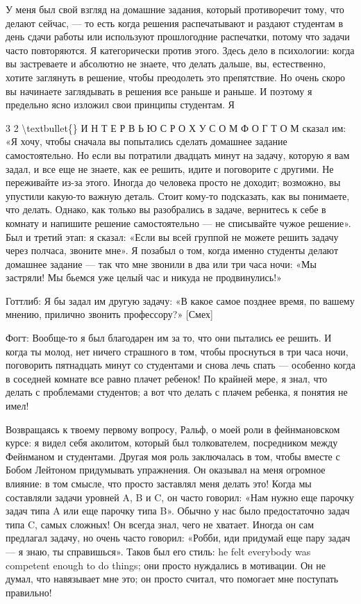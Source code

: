 \documentclass[10pt,oneside]{article}
\begin{document}
У меня был свой взгляд на домашние задания, который противоречит тому, что делают сейчас, --- то есть когда решения распечатывают и раздают студентам в день сдачи работы или используют прошлогодние распечатки, потому что задачи часто повторяются. Я категорически против этого. Здесь дело в психологии: когда вы застреваете и абсолютно не знаете, что делать дальше, вы, естественно, хотите заглянуть в решение, чтобы преодолеть это препятствие. Но очень скоро вы начинаете заглядывать в решения все раньше и раньше. И поэтому я предельно ясно изложил свои принципы студентам. Я\par

3 2 \textbackslash{}textbullet\{\} И Н Т Е Р В Ь Ю  С  Р О Х У С О М  Ф О Г Т О М сказал им: «Я хочу, чтобы сначала вы попытались сделать домашнее задание самостоятельно. Но если вы потратили двадцать минут на задачу, которую я вам задал, и все еще не знаете, как ее решить, идите и поговорите с другими. Не переживайте из-за этого. Иногда до человека просто не доходит; возможно, вы упустили какую-то важную деталь. Стоит кому-то подсказать, как вы понимаете, что делать. Однако, как только вы разобрались в задаче, вернитесь к себе в комнату и напишите решение самостоятельно --- не списывайте чужое решение». Был и третий этап: я сказал: «Если вы всей группой не можете решить задачу через полчаса, звоните мне». Я позабыл о том, когда именно студенты делают домашнее задание --- так что мне звонили в два или три часа ночи: «Мы застряли! Мы бьемся уже целый час и никуда не продвинулись!»\par

Готтлиб: Я бы задал им другую задачу: «В какое самое позднее время, по вашему мнению, прилично звонить профессору?» [Смех]\par

Фогт: Вообще-то я был благодарен им за то, что они пытались ее решить. И когда ты молод, нет ничего страшного в том, чтобы проснуться в три часа ночи, поговорить пятнадцать минут со студентами и снова лечь спать --- особенно когда в соседней комнате все равно плачет ребенок! По крайней мере, я знал, что делать с проблемами студентов; а вот что делать с плачем ребенка, я понятия не имел!\par

Возвращаясь к твоему первому вопросу, Ральф, о моей роли в фейнмановском курсе: я видел себя аколитом, который был толкователем, посредником между Фейнманом и студентами. Другая моя роль заключалась в том, чтобы вместе с Бобом Лейтоном придумывать упражнения. Он оказывал на меня огромное влияние: в том смысле, что просто заставлял меня делать это! Когда мы составляли задачи уровней A, B и C, он часто говорил: «Нам нужно еще парочку задач типа A или еще парочку типа B». Обычно у нас было предостаточно задач типа C, самых сложных! Он всегда знал, чего не хватает. Иногда он сам предлагал задачу, но очень часто говорил: «Робби, иди придумай еще пару задач --- я знаю, ты справишься». Таков был его стиль: he felt everybody was competent enough to do things; они просто нуждались в мотивации. Он не думал, что навязывает мне это; он просто считал, что помогает мне поступать правильно!\par
\end{document}
